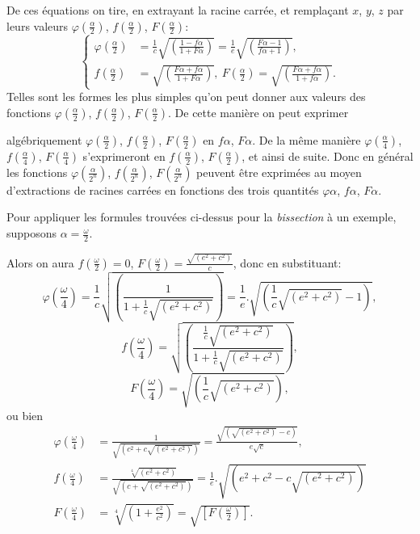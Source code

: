 \documentclass{article}
\begin{document}
De ces équations on tire, en extrayant la racine carrée, et remplaçant $x$, $y$, $z$ par leurs valeurs $\varphi\left(\frac{\alpha}{2}\right)$, $f\left(\frac{\alpha}{2}\right)$, $F\left(\frac{\alpha}{2}\right)$:
\[ \left\{\begin{aligned}
\varphi\left(\frac{\alpha}{2}\right)&=\frac{1}{c}\sqrt{\left(\frac{1-f\alpha}{1+F\alpha}\right)}=\frac{1}{e}\sqrt{\left(\frac{F\alpha-1}{f\alpha+1}\right)},\\
f\left(\frac{\alpha}{2}\right)&=\sqrt{\left(\frac{F\alpha+f\alpha}{1+F\alpha}\right)},\ F\left(\frac{\alpha}{2}\right)=\sqrt{\left(\frac{F\alpha+f\alpha}{1+f\alpha}\right)}.
\end{aligned}\right. \tag{67.} \]
Telles sont les formes les plus simples qu'on peut donner aux valeurs des fonctions $\varphi\left(\frac{\alpha}{2}\right)$, $f\left(\frac{\alpha}{2}\right)$, $F\left(\frac{\alpha}{2}\right)$. De cette manière on peut exprimer

algébriquement $\varphi\left(\frac{\alpha}{2}\right)$, $f\left(\frac{\alpha}{2}\right)$, $F\left(\frac{\alpha}{2}\right)$ en $f\alpha$, $F\alpha$. De la même manière $\varphi\left(\frac{\alpha}{4}\right)$, $f\left(\frac{\alpha}{4}\right)$, $F\left(\frac{\alpha}{4}\right)$ s'exprimeront en $f\left(\frac{\alpha}{2}\right)$, $F\left(\frac{\alpha}{2}\right)$, et ainsi de suite. Donc en général les fonctions $\varphi\left(\frac{\alpha}{2^{n}}\right)$, $f\left(\frac{\alpha}{2^{n}}\right)$, $F\left(\frac{\alpha}{2^{n}}\right)$ peuvent être exprimées au moyen d'extractions de racines carrées en fonctions des trois quantités $\varphi\alpha$, $f\alpha$, $F\alpha$.

Pour appliquer les formules trouvées ci-dessus pour la \emph{bissection} à un exemple, supposons $\alpha=\frac{\omega}{2}$.

Alors on aura $f\left(\frac{\omega}{2}\right)=0$, $F\left(\frac{\omega}{2}\right)=\frac{\sqrt{(e^{2}+c^{2})}}{c}$, donc en substituant:
\[ \varphi\left(\frac{\omega}{4}\right)=\frac{1}{c}\sqrt{\left(\frac{1}{1+\frac{1}{c}\sqrt{(e^{2}+c^{2})}}\right)}=\frac{1}{e}.\sqrt{\left(\frac{1}{c}\sqrt{(e^{2}+c^{2})}-1\right)}, \]
\[ f\left(\frac{\omega}{4}\right)=\sqrt{\left(\frac{\frac{1}{c}\sqrt{(e^{2}+c^{2})}}{1+\frac{1}{c}\sqrt{(e^{2}+c^{2})}}\right)}, \]
\[ F\left(\frac{\omega}{4}\right)=\sqrt{\left(\frac{1}{c}\sqrt{(e^{2}+c^{2})}\right)}, \]
ou bien
\[ \begin{aligned}
\varphi\left(\frac{\omega}{4}\right)&=\frac{1}{\sqrt{(c^{2}+c\sqrt{(e^{2}+c^{2})})}}=\frac{\sqrt{(\sqrt{(e^{2}+c^{2})}-c)}}{e\sqrt{c}},\\
f\left(\frac{\omega}{4}\right)&=\frac{\sqrt[4]{(e^{2}+c^{2})}}{\sqrt{(c+\sqrt{(e^{2}+c^{2})})}}=\frac{1}{e}.\sqrt{(e^{2}+c^{2}-c\sqrt{(e^{2}+c^{2})})}\\
F\left(\frac{\omega}{4}\right)&=\sqrt[4]{\left(1+\frac{e^{2}}{c^{2}}\right)}=\sqrt{\left[F\left(\frac{\omega}{2}\right)\right]}.
\end{aligned} \]
\end{document}
